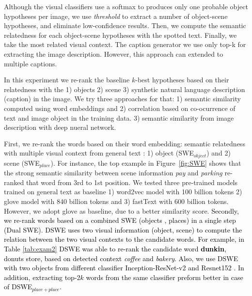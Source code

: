 \documentclass[phd,tocprelim]{cornell}
\begin{document}
Although the visual classifiers use a softmax to produces only one probable object hypotheses per image, we use \textit{threshold} to extract a number of object-scene hypotheses, and  eliminate  low-confidence results. Then, we compute the semantic relatedness for each object-scene hypotheses with the spotted text. Finally, we take the most related visual context. The caption generator we use only top-k for extracting the image description. However, this approach can extended to multiple captions.      


In this experiment we re-rank the baseline $k$-best hypotheses based on their relatedness with the 1) objects 2) scene 3) synthetic natural language description (caption) in the image. We try three approaches for that: 1) semantic similarity computed using word embeddings \cite{mikolov2013distributed} and 2) correlation based on co-ocurrence of text and image object in the training data. 3) semantic similarity from image description with  deep nueral network. 

First, we re-rank the words based on their word embedding: semantic relatedness with multiple visual context from general text : 1) object  (SWE$_{object}$) and 2) scene (SWE$_{place}$). For instance, the top example in Figure~\ref{fig:SWE}  shows that the strong semantic similarity between scene information \textit{pay} and \textit{parking} re-ranked that word from 3rd to 1st position. We tested three pre-trained models trained on general text as baseline 1) word2vec model with 100 billion tokens 2) glove model with 840 billion tokens \cite{pennington2014glove} and 3) fastText with 600 billion tokens. However, we adopt glove as baseline, due to a better similarity score. 
\textcolor{black}{Secondly, we re-rank words based on a combined SWE (objects , places) in a single step (Dual SWE). DSWE uses two visual information (object, scene) to compute the relation between the two visual contexts to the candidate words. For example, in Table \ref{tab:exam2} DSWE was able to re-rank the candidate word \textbf{dunkin}, donuts store, based on detected context \textit{coffee} and \textit{bakery}. Also, we use  DSWE with two objects from different classifier Inception-ResNet-v2 \cite{szegedy2017inception} and Resnet152 \cite{Kaiming:16}. In addition, extracting top-2$k$ words from the same classifier preform better in case of DSWE$_{place+place}$. } 
\end{document}
